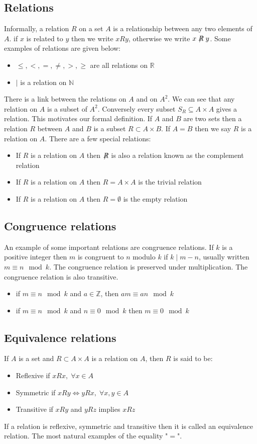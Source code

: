 \documentclass[12pt]{article}
\begin{document}
\subsection*{Relations}
Informally, a relation \(R\) on a set \(A\) is a relationship between any two elements of \(A\). if \(x\) is related to \(y\) then we write \(xRy\), otherwise we write \(x\not\mathrel{R}y\). Some examples of relations are given below:
\begin{itemize}
    \item \(\leq,<,=,\ne,>,\geq\) are all relations on \(\mathbb{R}\)
    \item \(\mid\) is a relation on \(\mathbb{N}\)
\end{itemize}
There is a link between the relations on \(A\) and on \(A^2\). We can see that any relation on \(A\) is a subset of \(A^2\). Conversely every subset \(S_R\subseteq A\times A\) gives a relation. This motivates our formal definition. If \(A\) and \(B\) are two sets then a relation \(R\) between \(A\) and \(B\) is a subset \(R\subset A\times B\). If \(A=B\) then we say \(R\) is a relation on \(A\). There are a few special relations:
\begin{itemize}
    \item If \(R\) is a relation on \(A\) then \(\not\mathrel{R}\) is also a relation known as the complement relation
    \item If \(R\) is a relation on \(A\) then \(R=A\times A\) is the trivial relation
    \item If \(R\) is a relation on \(A\) then \(R=\emptyset\) is the empty relation
\end{itemize}
\subsection*{Congruence relations}
An example of some important relations are congruence relations. If \(k\) is a positive integer then \(m\) is congruent to \(n\) modulo \(k\) if \(k\mid m-n\), usually written \(m \equiv n\mod{k}\). The congruence relation is preserved under multiplication. The congruence relation is also transitive.
\begin{itemize}
    \item if \(m\equiv n \mod{k}\) and \(a\in\mathbb{Z}\), then \(am\equiv an\mod{k}\)
    \item if \(m\equiv n \mod{k}\) and \(n\equiv 0 \mod{k}\) then \(m\equiv 0 \mod{k}\)
\end{itemize}
\subsection*{Equivalence relations}
If \(A\) is a set and \(R\subset A\times A\) is a relation on \(A\), then \(R\) is said to be:
\begin{itemize}
    \item Reflexive if \(xRx,\;\forall x\in A\)
    \item Symmetric if \(xRy\iff yRx,\;\forall x,y\in A\)
    \item Transitive if \(xRy\) and \(yRz\) implies \(xRz\)
\end{itemize}
If a relation is reflexive, symmetric and transitive then it is called an equivalence relation. The most natural examples of the equality "\(=\)".
\end{document}
